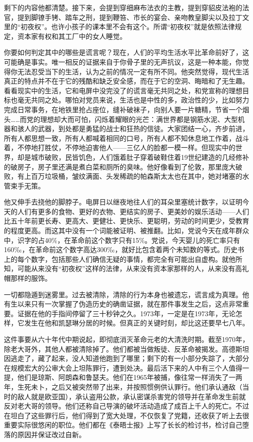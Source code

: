 剩下的内容他都清楚。接下来，会提到穿细麻布法衣的主教，提到穿貂皮法袍的法官，提到脚镣手铐、踏车之刑，提到鞭笞、市长的宴会、亲吻教皇脚尖以及拉丁文里的``初夜权''。也许小孩子的课本里不会有这个。所谓``初夜权''就是依照法律规定，资本家有权和其工厂中的女人睡觉。

你要如何判定其中的哪些是谎言呢？现在，人们的平均生活水平比革命前好了，这可能确是事实。唯一相反的证据来自于你骨子里的无声抗议，这是一种本能，你觉得你无法忍受当下的生活，认为之前的情况一定有所不同。他突然觉得，现代生活真正的特点并不在于它的残酷和缺乏安全感，而在于它的空洞、晦暗和了无生趣。看看现实中的生活，它和电屏中没完没了的谎言毫无共同之处，和党宣称的理想目标也毫无共同之处。哪怕对党员来说，生活也是中性的多，政治性的少，比如努力完成日常事务，在地铁里抢占座位，缝补破袜子，向别人要一片糖精，节省一个烟头\ldots\ldots 而党的理想却大而可怕，闪烁着耀眼的光芒：满世界都是钢筋水泥、大型机器和骇人的武器，到处都是勇猛的战士和狂热的信徒。大家团结一心，齐步前进，所有人都思想一致，所有人都喊着相同的口号，所有人都不知休息地工作着，战斗着，不停地打胜仗，不停地迫害他人------三亿人的脸都一模一样。但现实中的世界，却是城市破败，民皆饥色，人们饿着肚子穿着破鞋住着19世纪建造的几经修补的破房子，房子里还满是煮白菜和厕所的臭味。他好像看到了伦敦，那里庞大破败，有上百万垃圾桶，皱纹满面、头发稀疏的帕森斯太太也在其中，她对堵塞的水管束手无策。

他又伸手去挠他的脚脖子。电屏日以继夜地往人们的耳朵里塞统计数字，以证明今天的人们有更多的食物、更好的衣物、更结实的房子、更美妙的娱乐活动------人们比五十年前更长寿、更高大、更健壮、更快乐、更聪明，劳动的时间更少，受教育的程度更高。而这其中没有一个词能被证明、被推翻。比如，党说今天在成年群众中，识字的占40\%，在革命前这个数字只有15\%。党说，今天婴儿的死亡率只有160‰，在革命前这个数字高达300‰，就好比包含着两个未知数的等式。历史书上的每个数字，包括那些人们确信无疑的事情，都完全有可能出自虚构。就他所知，可能从来没有``初夜权''这样的法律，从来没有资本家那样的人，从来没有高礼帽那样的服饰。

一切都隐遁到迷雾里。过去被清除，清除的行为本身也被遗忘，谎言成为真理。他有生以来只有一次掌握了伪造历史的确凿证据，就在那件事发生之后，这点非常重要。证据在他的手指间停留了三十秒钟之久。1973年，一定是在1973年，无论怎样，它发生在他和凯瑟琳分居的时候。但真正的关键时刻，却比这还要早七八年。

这件事要从六十年代中期说起，即彻底消灭革命元老的大清洗时期。截至1970年，除老大哥外，其他人都被清除掉了。他们都被当做叛徒、反革命被揭发。高德斯坦因逃走了，藏了起来，没人知道他跑到了哪里；剩下的有一小部分失踪了，大部分在规模宏大的公审大会上坦陈罪行，遭到处决。最后活下来的人中有三个人值得一提，他们是琼斯、阿朗森和鲁瑟夫。他们在1965年被捕，像往常一样消失了一两年，生死未卜，之后又被突然带了出来，并按照惯例供认罪行。他们承认通敌（当时的敌人就是欧亚国），承认盗用公款，承认密谋杀害党的领导并在革命发生前就反对老大哥的领导。他们还称自己导演的破坏活动造成了成百上千人的死亡。不过在坦白了这些罪行后，他们得到了宽大处理，不仅恢复了党籍，还收获了听上去很重要实际很悠闲的职位。他们都在《泰晤士报》上写了长长的检讨书，检讨自己堕落的原因并保证改过自新。

